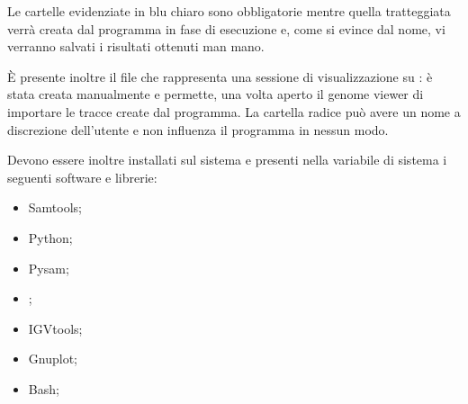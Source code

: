 

Le cartelle evidenziate in blu chiaro sono obbligatorie mentre quella tratteggiata verrà creata dal programma in fase di esecuzione e, come si evince dal nome, vi verranno salvati i risultati ottenuti man mano.

È presente inoltre il file  che rappresenta una sessione di visualizzazione su : è stata creata manualmente e permette, una volta aperto il genome viewer di importare le tracce create dal programma.
La cartella radice può avere un nome a discrezione dell'utente e non influenza il programma in nessun modo.

Devono essere inoltre installati sul sistema e presenti nella variabile di sistema  i seguenti software e librerie:
\begin{itemize}
\item Samtools;
\item Python;
\item Pysam;
\item {};
\item IGVtools;
\item Gnuplot;
\item Bash;
\end{itemize}

